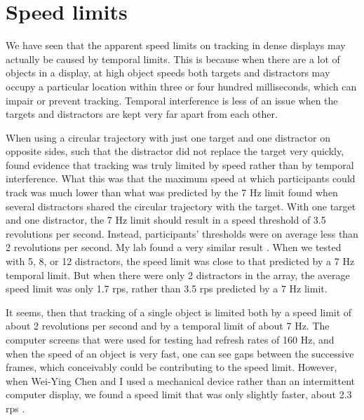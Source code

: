 \documentclass[
]{book}
\begin{document}
\hypertarget{speed-limits}{%
\section{Speed limits}\label{speed-limits}}

We have seen that the apparent speed limits on tracking in dense displays may actually be caused by temporal limits. This is because when there are a lot of objects in a display, at high object speeds both targets and distractors may occupy a particular location within three or four hundred milliseconds, which can impair or prevent tracking. Temporal interference is less of an issue when the targets and distractors are kept very far apart from each other.

When using a circular trajectory with just one target and one distractor on opposite sides, such that the distractor did not replace the target very quickly, \citet{verstratenLimitsAttentiveTracking2000} found evidence that tracking was truly limited by speed rather than by temporal interference. What this was that the maximum speed at which participants could track was much lower than what was predicted by the 7 Hz limit found when several distractors shared the circular trajectory with the target. With one target and one distractor, the 7 Hz limit should result in a speed threshold of 3.5 revolutions per second. Instead, participants' thresholds were on average less than 2 revolutions per second. My lab found a very similar result \citep{holcombeSplittingAttentionReduces2013}. When we tested with 5, 8, or 12 distractors, the speed limit was close to that predicted by a 7 Hz temporal limit. But when there were only 2 distractors in the array, the average speed limit was only 1.7 rps, rather than 3.5 rps predicted by a 7 Hz limit.

It seems, then that tracking of a single object is limited both by a speed limit of about 2 revolutions per second and by a temporal limit of about 7 Hz. The computer screens that were used for testing had refresh rates of 160 Hz, and when the speed of an object is very fast, one can see gaps between the successive frames, which conceivably could be contributing to the speed limit. However, when Wei-Ying Chen and I used a mechanical device rather than an intermittent computer display, we found a speed limit that was only slightly faster, about 2.3 rps \citep{holcombeSpeedLimitAttentional}.
\end{document}
